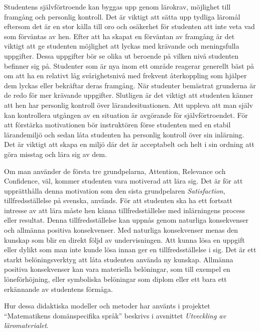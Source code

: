 \documentclass[]{article}
\begin{document}
Studentens självförtroende kan byggas upp genom lärokrav,
möjlighet till fram\-gång och personlig kontroll.
Det är viktigt att sätta upp tydliga läromål eftersom det är en stor
källa till oro och osäkerhet för studenten att inte veta vad som
förväntas av hen. Efter att ha skapat en förväntan av framgång är det
viktigt att ge studenten möjlighet att lyckas med krävande och
meningsfulla uppgifter. Dessa uppgifter bör se olika ut beroende på
vilken nivå studenten befinner sig på. Studenter som är nya inom ett område
reagerar generellt bäst på om att ha en relativt låg svårighetsnivå med frekvent
återkoppling som hjälper dem lyckas eller bekräftar deras framgång.
När studenter bemästrat grunderna är de redo för mer krävande uppgifter.
Slutligen är det viktigt att studenten känner att hen har personlig
kontroll över lärandesituationen. Att uppleva att man själv kan
kontrollera utgången av en situation är avgörande för självförtroendet.
För att förstärka motivationen bör instruktören förse studenten med en
stabil lärandemiljö och sedan låta studenten ha personlig kontroll över sin
inlärning. Det är viktigt att skapa en miljö där det är acceptabelt och helt
i sin ordning att göra misstag och lära sig av dem.

Om man använder de första tre grundpelarna, Attention, Relevance och Confidence,
väl, kommer studenten vara motiverad att lära sig.
Det är för att upprätthålla denna motivation som den sista grundpelaren
\textit{Satisfaction}, tillfredsställelse på svenska, används.
För att studenten ska ha ett fortsatt intresse av att lära måste hen känna
tillfredsställelse med inlärningens process eller resultat.
Denna tillfredsställelse kan uppnås genom naturliga konsekvenser och allmänna positiva
konsekvenser. Med naturliga konsekvenser menas den kunskap som blir
en direkt följd av undervisningen. Att kunna lösa en uppgift eller dylikt
som man inte kunde lösa innan ger en tillfredsställelse i sig.
Det är ett starkt belöningsverktyg att låta studenten använda ny kunskap.
Allmänna positiva konsekvenser kan vara materiella belöningar,
som till exempel en löneförhöjning, eller symboliska belöningar som diplom
eller ett bara ett erkännande av studentens förmåga.

Hur dessa didaktiska modeller och metoder har använts i projektet
``Matematikens domänspecifika språk'' beskrivs i avsnittet
\textit{Utveckling av läromaterialet}.
\end{document}
